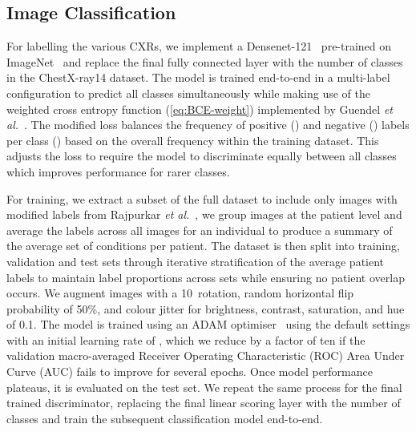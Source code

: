 \documentclass{article}
\begin{document}
\subsection{Image Classification}
\label{sec:classifier-train}
For labelling the various CXRs, we implement a Densenet-121~\cite{huangDenselyConnectedConvolutional2018} pre-trained on ImageNet~\cite{russakovskyImageNetLargeScale2015} and replace the final fully connected layer with the number of classes in the ChestX-ray14 dataset. The model is trained end-to-end in a multi-label configuration to predict all classes simultaneously while making use of the weighted cross entropy function (\ref{eq:BCE-weight}) implemented by Guendel \emph{et al.}~\cite{guendelLearningRecognizeAbnormalities2018}. The modified loss balances the frequency of positive () and negative () labels per class () based on the overall frequency within the training dataset. This adjusts the loss to require the model to discriminate equally between all classes which improves performance for rarer classes.



For training, we extract a subset of the full dataset to include only images with modified labels from Rajpurkar \emph{et al.}~\cite{rajpurkarDeepLearningChest2018}, we group images at the patient level and average the labels across all images for an individual to produce a summary of the average set of conditions per patient. The dataset is then split into training, validation and test sets through iterative stratification of the average patient labels to maintain label proportions across sets while ensuring no patient overlap occurs. We augment images with a 10\textdegree \ rotation, random horizontal flip probability of 50\%, and colour jitter for brightness, contrast, saturation, and hue of \num{0.1}. The model is trained using an ADAM optimiser~\cite{kingmaAdamMethodStochastic2015} using the default settings with an initial learning rate of , which we reduce by a factor of ten if the validation macro-averaged Receiver Operating Characteristic (ROC) Area Under Curve (AUC) fails to improve for several epochs. Once model performance plateaus, it is evaluated on the test set. We repeat the same process for the final trained discriminator, replacing the final linear scoring layer with the number of classes and train the subsequent classification model end-to-end.
\end{document}
